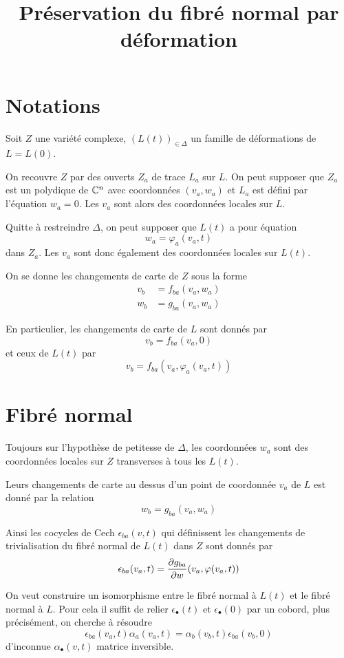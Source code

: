 \documentclass[a4paper]{article}
\date{}
\title{Préservation du fibré normal par déformation}
\begin{document}
\maketitle
\tableofcontents


\section{Notations}
\label{sec-1}
Soit $Z$ une variété complexe, $(L(t))_{\in \Delta}$ un famille de déformations de $L = L(0)$.

On recouvre $Z$ par des ouverts $Z_a$ de trace $L_a$ sur $L$. On peut supposer que $Z_a$ est un polydique de $\mathbb{C}^n$ avec coordonnées $(v_a,w_a)$ et $L_a$ est défini par l'équation $w_a = 0$. Les $v_a$ sont alors des coordonnées locales sur $L$.

Quitte à restreindre $\Delta$, on peut supposer que $L(t)$ a pour équation
\[
w_a = \varphi_a(v_a,t)
\]
dans $Z_a$. Les $v_a$ sont donc également des coordonnées locales sur $L(t)$.

On se donne les changements de carte de $Z$ sous la forme
\begin{align}
v_b &= f_{ba}(v_a,w_a)\\
w_b &= g_{ba}(v_a,w_a)
\end{align}

En particulier, les changements de carte de $L$ sont donnés par
\[
v_b = f_{ba}(v_a,0)
\]
et ceux de $L(t)$ par
\[
v_b = f_{ba}(v_a,\varphi_a(v_a,t))
\]

\section{Fibré normal}
\label{sec-2}
Toujours sur l'hypothèse de petitesse de $\Delta$, les coordonnées $w_a$ sont des coordonnées locales sur $Z$ transverses à tous les $L(t)$.

Leurs changements de carte au dessus d'un point de coordonnée $v_a$ de $L$ est donné par la relation
\[
w_b = g_{ba}(v_a,w_a)
\]

Ainsi les cocycles de Cech $\epsilon_{ba}(v,t)$ qui définissent les changements de trivialisation du fibré normal de $L(t)$ dans $Z$ sont donnés par
\[
\epsilon_{ba}(v_a,t) = \dfrac{\partial{g_{ba}}}{\partial{w}}(v_a,\varphi(v_a,t))
\]

On veut construire un isomorphisme entre le fibré normal à $L(t)$ et le fibré normal à $L$. Pour cela il suffit de relier $\epsilon_\bullet(t)$ et $\epsilon_\bullet(0)$ par un cobord, plus précisément, on cherche à résoudre
\begin{equation}
\label{cobord}
\epsilon_{ba}(v_a,t)\alpha_a(v_a,t) = \alpha_b(v_b,t)\epsilon_{ba}(v_b,0)
\end{equation}
d'inconnue $\alpha_\bullet(v,t)$ matrice inversible.
\end{document}
